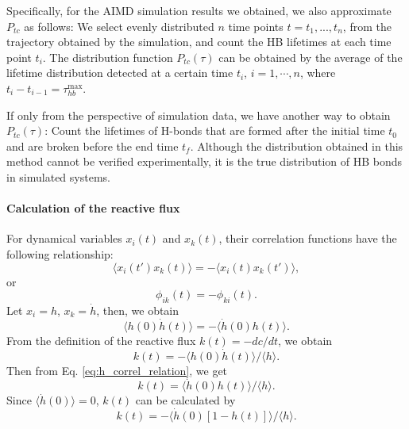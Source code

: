 {Specifically, for the AIMD simulation results we obtained, we also approximate $P_{tc}$ as follows: 
We select evenly distributed $n$ time points $t=t_1,...,t_n$, from the trajectory obtained by the simulation, 
and count the HB lifetimes at each time point $t_i$.
The distribution function $P_{tc}(\tau)$ 
can be obtained by the average of the lifetime distribution detected at a certain time $t_i$, $i=1,\cdots, n$, 
where $t_i-t_{i-1} = \tau_{hb}^{\max}$. 

If only from the perspective of simulation data, we have another way to obtain $P_{tc}(\tau)$: 
Count the lifetimes of H-bonds that are formed after the initial time $t_0$ and are broken before the end time $t_f$.
Although the distribution obtained in this method cannot be verified experimentally, 
it is the true distribution of HB bonds in simulated systems. 


\paragraph{Calculation of the reactive flux}\label{calc_rf}
For dynamical variables $x_i(t)$ and $x_k(t)$, their correlation functions have the following relationship:\cite{Landau1980}
\begin{equation}
\langle x_i(t') x_k(t)\rangle = -\langle x_i(t) x_k(t')\rangle,
\label{eq:correlation_relation}
\end{equation}
or 
\begin{equation}
\phi_{ik}(t) = -\phi_{ki}(t). \nonumber
\label{eq:correlation_relation2}
\end{equation}
Let $x_i = h$, $x_k = \dot h$,
then, we obtain
\begin{equation}
\langle h(0) \dot{h}(t)\rangle=-\langle\dot{h}(0) h(t)\rangle. 
\label{eq:h_correl_relation}
\end{equation}
From the definition of the reactive flux $k(t) = -dc/dt$, we obtain 
\begin{equation}
k(t)=-\langle h(0) \dot{h}(t)\rangle /\langle h\rangle. 
\label{eq:rf1}
\end{equation}
Then from Eq. \ref{eq:h_correl_relation},
we get 
\begin{equation}
k(t) =  \langle \dot{h}(0)h(t)\rangle /\langle h\rangle. \nonumber
\label{eq:rf2}
\end{equation}
Since $\langle\dot{h}(0)\rangle=0$, $k(t)$ can be calculated by
\begin{equation}
k(t) = - \langle \dot{h}(0)[1-h(t)]\rangle /\langle h\rangle.
\label{eq:rf3}
\end{equation}

}
